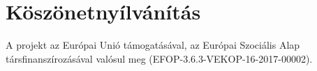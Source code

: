
\tableofcontents




%
%


\section{K\"osz\"onetny\'ilv\'an\'it\'as}
A projekt az Európai Unió támogatásával, az Európai Szociális Alap
társfinanszírozásával valósul meg (EFOP-3.6.3-VEKOP-16-2017-00002).


